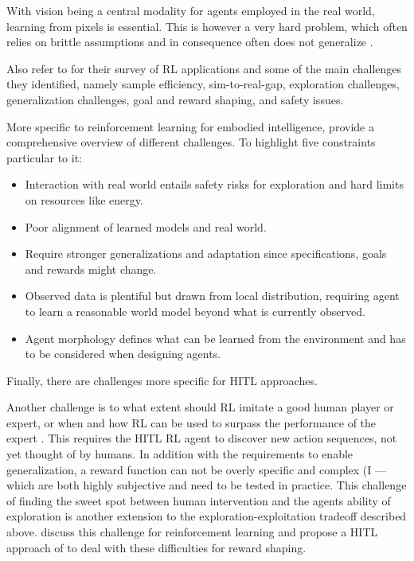 \documentclass[twoside,11pt]{article}
\begin{document}
With vision being a central modality for agents employed in the real world, learning from pixels is essential. This is however a very hard problem, which often relies on brittle assumptions and in consequence often does not generalize \citep{TomarEtAl:2021:LearnPixelControlRepresentations}. 

Also refer to \citet{ibarz2021train} for their survey of RL applications and some of the main challenges they identified, namely sample efficiency, sim-to-real-gap, exploration challenges, generalization challenges, goal and reward shaping, and safety issues. 

More specific to reinforcement learning for embodied intelligence, \citet{RoyEtAl:2021:RLRoboticsChallenges} provide a comprehensive overview of different challenges. To highlight five constraints particular to it:
\begin{itemize}
    \item Interaction with real world entails safety risks for exploration and hard limits on resources like energy.
    \item Poor alignment of learned models and real world.
    \item Require stronger generalizations  and adaptation since specifications, goals and rewards might change.
    \item Observed data is plentiful but drawn from local distribution, requiring agent to learn a reasonable world model beyond  what is currently observed. 
    \item Agent morphology defines what can be learned from the environment and has to be considered when designing agents.
\end{itemize}

Finally, there are challenges more specific for HITL approaches. 

Another challenge is to what extent should RL imitate a good human player or expert, or when and how RL can be used to surpass the performance of the expert \citep{Abel:2017:AgentAgnosticHumanInTheLoopRL}. This requires the HITL RL agent to discover new action sequences, not yet thought of by humans. In addition with the requirements to enable generalization, a reward function can not be overly specific and complex (\citep{LiuAbbeel:2020:UnsupervisedActivePreTraining}I --- which are both highly subjective and need to be tested in practice. This challenge of finding the sweet spot between human intervention and the agents ability of exploration is another extension to the exploration-exploitation tradeoff described above. \citet{LeeSmithAbbeel:2021:FeedbackPreferenceHITLLearningPEBBLE} discuss this challenge for reinforcement learning and propose a HITL approach of to deal with these difficulties for reward shaping.
\end{document}
